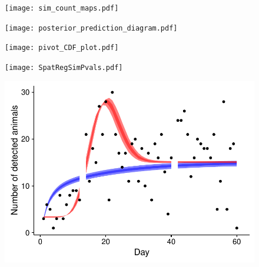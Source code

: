 \documentclass[12pt,english]{article}
\begin{document}
\begin{spacing}{1.9}
\begin{figure}
  \begin{center}
    \texttt{[image: sim\_count\_maps.pdf]}
    \caption{} \label{fig:sim_maps}
  \end{center}
\end{figure}

\begin{figure}
  \begin{center}
    \texttt{[image: posterior\_prediction\_diagram.pdf]}
    \caption{} \label{fig:post_pred}
  \end{center}
\end{figure}

\begin{figure}
  \begin{center}
    \texttt{[image: pivot\_CDF\_plot.pdf]}
    \caption{} \label{fig:pivotCDF}
  \end{center}
\end{figure}

\begin{figure}
  \begin{center}
    \texttt{[image: SpatRegSimPvals.pdf]}
    \caption{} \label{fig:SpatReg_pvals}
  \end{center}
\end{figure}

\begin{figure}
  \begin{center}
    \includegraphics[width=170mm]{attendance_fit.pdf}
    \caption{} \label{fig:attend}
  \end{center}
\end{figure}


\end{spacing}
\end{document}
